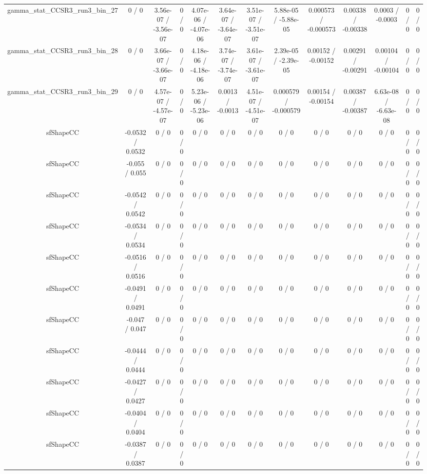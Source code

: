 \documentclass[10pt]{article}
\begin{document}
\begin{table}[htbp]
\begin{center}
\begin{tabular}{|c|c|c|c|c|c|c|c|c|c|c|c|c|}
  gamma_stat_CCSR3_run3_bin_27 & 0 / 0 & 3.56e-07 / -3.56e-07 & 0 / 0 & 4.07e-06 / -4.07e-06 & 3.64e-07 / -3.64e-07 & 3.51e-07 / -3.51e-07 & 5.88e-05 / -5.88e-05 & 0.000573 / -0.000573 & 0.00338 / -0.00338 & 0.0003 / -0.0003 & 0 / 0 & 0 / 0 \\ 
  gamma_stat_CCSR3_run3_bin_28 & 0 / 0 & 3.66e-07 / -3.66e-07 & 0 / 0 & 4.18e-06 / -4.18e-06 & 3.74e-07 / -3.74e-07 & 3.61e-07 / -3.61e-07 & 2.39e-05 / -2.39e-05 & 0.00152 / -0.00152 & 0.00291 / -0.00291 & 0.00104 / -0.00104 & 0 / 0 & 0 / 0 \\ 
  gamma_stat_CCSR3_run3_bin_29 & 0 / 0 & 4.57e-07 / -4.57e-07 & 0 / 0 & 5.23e-06 / -5.23e-06 & 0.0013 / -0.0013 & 4.51e-07 / -4.51e-07 & 0.000579 / -0.000579 & 0.00154 / -0.00154 & 0.00387 / -0.00387 & 6.63e-08 / -6.63e-08 & 0 / 0 & 0 / 0 \\ 
  sfShapeCC & -0.0532 / 0.0532 & 0 / 0 & 0 / 0 & 0 / 0 & 0 / 0 & 0 / 0 & 0 / 0 & 0 / 0 & 0 / 0 & 0 / 0 & 0 / 0 & 0 / 0 \\ 
  sfShapeCC & -0.055 / 0.055 & 0 / 0 & 0 / 0 & 0 / 0 & 0 / 0 & 0 / 0 & 0 / 0 & 0 / 0 & 0 / 0 & 0 / 0 & 0 / 0 & 0 / 0 \\ 
  sfShapeCC & -0.0542 / 0.0542 & 0 / 0 & 0 / 0 & 0 / 0 & 0 / 0 & 0 / 0 & 0 / 0 & 0 / 0 & 0 / 0 & 0 / 0 & 0 / 0 & 0 / 0 \\ 
  sfShapeCC & -0.0534 / 0.0534 & 0 / 0 & 0 / 0 & 0 / 0 & 0 / 0 & 0 / 0 & 0 / 0 & 0 / 0 & 0 / 0 & 0 / 0 & 0 / 0 & 0 / 0 \\ 
  sfShapeCC & -0.0516 / 0.0516 & 0 / 0 & 0 / 0 & 0 / 0 & 0 / 0 & 0 / 0 & 0 / 0 & 0 / 0 & 0 / 0 & 0 / 0 & 0 / 0 & 0 / 0 \\ 
  sfShapeCC & -0.0491 / 0.0491 & 0 / 0 & 0 / 0 & 0 / 0 & 0 / 0 & 0 / 0 & 0 / 0 & 0 / 0 & 0 / 0 & 0 / 0 & 0 / 0 & 0 / 0 \\ 
  sfShapeCC & -0.047 / 0.047 & 0 / 0 & 0 / 0 & 0 / 0 & 0 / 0 & 0 / 0 & 0 / 0 & 0 / 0 & 0 / 0 & 0 / 0 & 0 / 0 & 0 / 0 \\ 
  sfShapeCC & -0.0444 / 0.0444 & 0 / 0 & 0 / 0 & 0 / 0 & 0 / 0 & 0 / 0 & 0 / 0 & 0 / 0 & 0 / 0 & 0 / 0 & 0 / 0 & 0 / 0 \\ 
  sfShapeCC & -0.0427 / 0.0427 & 0 / 0 & 0 / 0 & 0 / 0 & 0 / 0 & 0 / 0 & 0 / 0 & 0 / 0 & 0 / 0 & 0 / 0 & 0 / 0 & 0 / 0 \\ 
  sfShapeCC & -0.0404 / 0.0404 & 0 / 0 & 0 / 0 & 0 / 0 & 0 / 0 & 0 / 0 & 0 / 0 & 0 / 0 & 0 / 0 & 0 / 0 & 0 / 0 & 0 / 0 \\ 
  sfShapeCC & -0.0387 / 0.0387 & 0 / 0 & 0 / 0 & 0 / 0 & 0 / 0 & 0 / 0 & 0 / 0 & 0 / 0 & 0 / 0 & 0 / 0 & 0 / 0 & 0 / 0 \\ 

\end{tabular}
\end{center}
\end{table}
\end{document}
